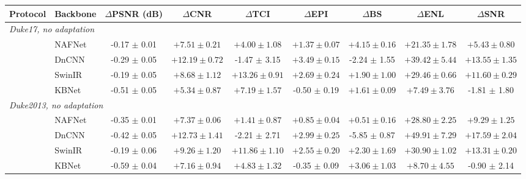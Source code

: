 \begin{tabular}{llccccccc}
\toprule
Protocol & Backbone & $\Delta$PSNR (dB) & $\Delta$CNR & $\Delta$TCI & $\Delta$EPI & $\Delta$BS & $\Delta$ENL & $\Delta$SNR \\
\midrule
\multicolumn{9}{l}{\textit{Duke17, no adaptation}} \\
 & NAFNet & -0.17 $\pm$ 0.01 & $\mathbf{+7.51 \pm 0.21}$ & $\mathbf{+4.00 \pm 1.08}$ & $\mathbf{+1.37 \pm 0.07}$ & $\mathbf{+4.15 \pm 0.16}$ & $\mathbf{+21.35 \pm 1.78}$ & $\mathbf{+5.43 \pm 0.80}$ \\
 & DnCNN & -0.29 $\pm$ 0.05 & $\mathbf{+12.19 \pm 0.72}$ & -1.47 $\pm$ 3.15 & $\mathbf{+3.49 \pm 0.15}$ & -2.24 $\pm$ 1.55 & $\mathbf{+39.42 \pm 5.44}$ & $\mathbf{+13.55 \pm 1.35}$ \\
 & SwinIR & -0.19 $\pm$ 0.05 & $\mathbf{+8.68 \pm 1.12}$ & $\mathbf{+13.26 \pm 0.91}$ & $\mathbf{+2.69 \pm 0.24}$ & $\mathbf{+1.90 \pm 1.00}$ & $\mathbf{+29.46 \pm 0.66}$ & $\mathbf{+11.60 \pm 0.29}$ \\
 & KBNet & -0.51 $\pm$ 0.05 & $\mathbf{+5.34 \pm 0.87}$ & $\mathbf{+7.19 \pm 1.57}$ & -0.50 $\pm$ 0.19 & $\mathbf{+1.61 \pm 0.09}$ & $\mathbf{+7.49 \pm 3.76}$ & -1.81 $\pm$ 1.80 \\
\midrule
\multicolumn{9}{l}{\textit{Duke2013, no adaptation}} \\
 & NAFNet & -0.35 $\pm$ 0.01 & $\mathbf{+7.37 \pm 0.06}$ & $\mathbf{+1.41 \pm 0.87}$ & $\mathbf{+0.85 \pm 0.04}$ & $\mathbf{+0.51 \pm 0.16}$ & $\mathbf{+28.80 \pm 2.25}$ & $\mathbf{+9.29 \pm 1.25}$ \\
 & DnCNN & -0.42 $\pm$ 0.05 & $\mathbf{+12.73 \pm 1.41}$ & -2.21 $\pm$ 2.71 & $\mathbf{+2.99 \pm 0.25}$ & -5.85 $\pm$ 0.87 & $\mathbf{+49.91 \pm 7.29}$ & $\mathbf{+17.59 \pm 2.04}$ \\
 & SwinIR & -0.19 $\pm$ 0.06 & $\mathbf{+9.26 \pm 1.20}$ & $\mathbf{+11.86 \pm 1.10}$ & $\mathbf{+2.55 \pm 0.20}$ & $\mathbf{+2.30 \pm 1.69}$ & $\mathbf{+30.90 \pm 1.02}$ & $\mathbf{+13.31 \pm 0.20}$ \\
 & KBNet & -0.59 $\pm$ 0.04 & $\mathbf{+7.16 \pm 0.94}$ & $\mathbf{+4.83 \pm 1.32}$ & -0.35 $\pm$ 0.09 & $\mathbf{+3.06 \pm 1.03}$ & $\mathbf{+8.70 \pm 4.55}$ & -0.90 $\pm$ 2.14 \\
\bottomrule
\end{tabular}
